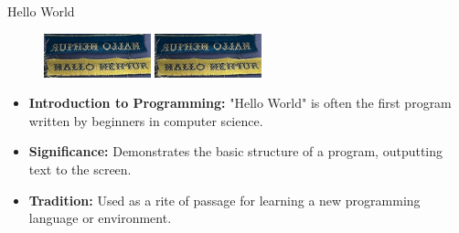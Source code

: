 \documentclass[
    NAME={Dr. Helga Ingimundardóttir},
    EMAIL={helgaingim@hi.is},
    FACULTY={Industrial Engineering},
    TITLE={HiDef Textiles: Reviving Tradition with Innovation},
    SUBTITLE={Empowering Creativity and Sustainability in Textile Production through Digital Transformation},
    SEMINAR={Reykjavík DataBeers},
    DATE={January 25, 2025},
    WIDE={true}
]{HI-LaTeX/hi-beamer}
\begin{document}
\begin{frame}{Hello World}
\begin{figure}
    \centering
    \includegraphics[height=36pt, clip=true, trim=0 5mm 0 0]{include/helloworld.png}      
    \includegraphics[height=36pt, clip=true, trim=0 0 0 5mm]{include/helloworld.png}
\end{figure}
    

 \begin{itemize}
                \item \textbf{Introduction to Programming:} "Hello World" is often the first program written by beginners in computer science.
                \item \textbf{Significance:} Demonstrates the basic structure of a program, outputting text to the screen.
                \item \textbf{Tradition:} Used as a rite of passage for learning a new programming language or environment.
\end{itemize}
\end{frame}
\end{document}
